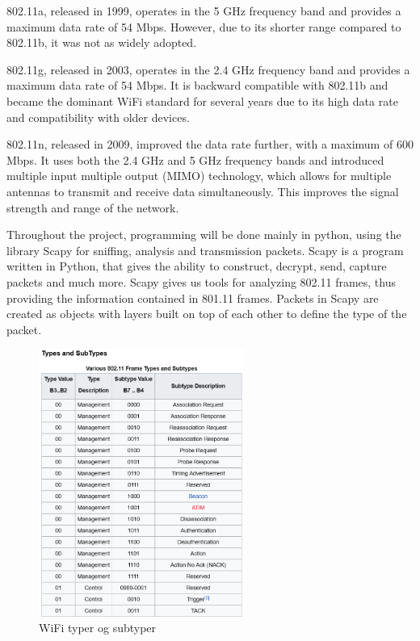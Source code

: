 802.11a, released in 1999, operates in the 5 GHz frequency band and provides a maximum data rate of 54 Mbps. However, due to its shorter range compared to 802.11b, it was not as widely adopted.

802.11g, released in 2003, operates in the 2.4 GHz frequency band and provides a maximum data rate of 54 Mbps. It is backward compatible with 802.11b and became the dominant WiFi standard for several years due to its high data rate and compatibility with older devices.

802.11n, released in 2009, improved the data rate further, with a maximum of 600 Mbps. It uses both the 2.4 GHz and 5 GHz frequency bands and introduced multiple input multiple output (MIMO) technology, which allows for multiple antennas to transmit and receive data simultaneously. This improves the signal strength and range of the network.

Throughout the project, programming will be done mainly in python, using the library Scapy for sniffing, analysis and transmission packets. Scapy is a program written in Python, that gives the ability to construct, decrypt, send, capture packets and much more\cite{IEEE_Scapy}. Scapy gives us tools for analyzing 802.11 frames, thus providing the information contained in 801.11 frames. Packets in Scapy are created as objects with layers built on top of each other to define the type of the packet.





\begin{figure}[!htbp]
    \centering
    \includegraphics[width=0.6\textwidth]{Latex-Files/Billeder/WIFI_Types.png}
    \caption{WiFi typer og subtyper}
    \label{Wifi Types}
\end{figure}


